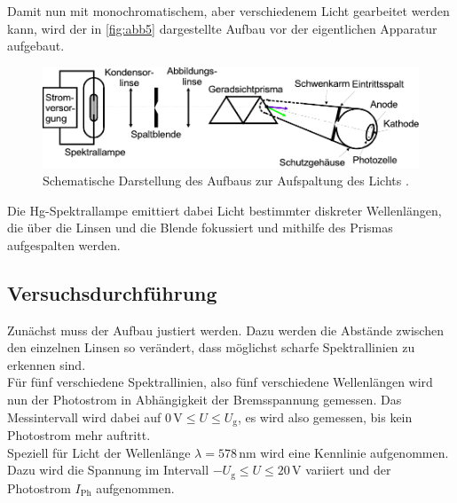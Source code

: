 Damit nun mit monochromatischem, aber verschiedenem Licht gearbeitet werden kann, wird der in \autoref{fig:abb5} dargestellte Aufbau vor der eigentlichen Apparatur aufgebaut.

\begin{figure}[H]
    \centering
    \includegraphics{figures/Abb5.pdf}
    \caption{Schematische Darstellung des Aufbaus zur Aufspaltung des Lichts \cite{ap10}.}
    \label{fig:abb5}
\end{figure}

Die Hg-Spektrallampe emittiert dabei Licht bestimmter diskreter Wellenlängen, die über die Linsen und die Blende fokussiert und mithilfe des Prismas aufgespalten werden.


\subsection{Versuchsdurchführung}

Zunächst muss der Aufbau justiert werden.
Dazu werden die Abstände zwischen den einzelnen Linsen so verändert, dass möglichst scharfe Spektrallinien zu erkennen sind. \\

Für fünf verschiedene Spektrallinien, also fünf verschiedene Wellenlängen wird nun der Photostrom in Abhängigkeit der Bremsspannung gemessen.
Das Messintervall wird dabei auf $0 \,\unit{\volt} \leq U \leq U_\text{g}$, es wird also gemessen, bis kein Photostrom mehr auftritt. \\

Speziell für Licht der Wellenlänge $\lambda = 578 \, \unit{\nano\meter}$ wird eine Kennlinie aufgenommen.
Dazu wird die Spannung im Intervall $-U_\text{g} \leq U \leq 20 \,\unit{\volt}$ variiert und der Photostrom $I_\text{Ph}$ aufgenommen.

